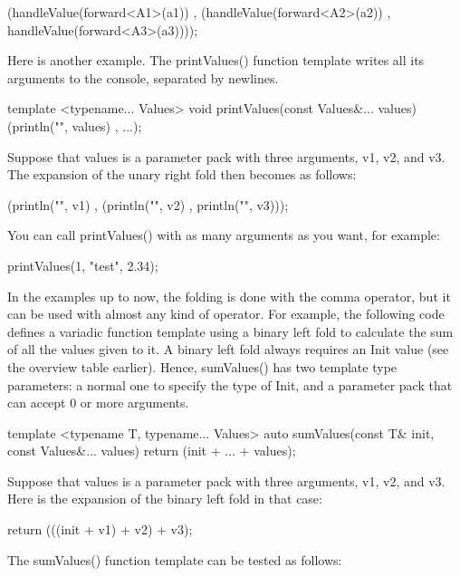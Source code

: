 \begin{cpp}
(handleValue(forward<A1>(a1)) ,
    (handleValue(forward<A2>(a2)) , handleValue(forward<A3>(a3))));
\end{cpp}

Here is another example. The printValues() function template writes all its arguments to the console, separated by newlines.

\begin{cpp}
template <typename... Values>
void printValues(const Values&... values) { (println("{}", values) , ...); }
\end{cpp}

Suppose that values is a parameter pack with three arguments, v1, v2, and v3. The expansion of the unary right fold then becomes as follows:

\begin{cpp}
(println("{}", v1) , (println("{}", v2) , println("{}", v3)));
\end{cpp}

You can call printValues() with as many arguments as you want, for example:

\begin{cpp}
printValues(1, "test", 2.34);
\end{cpp}

In the examples up to now, the folding is done with the comma operator, but it can be used with almost any kind of operator. For example, the following code defines a variadic function template using a binary left fold to calculate the sum of all the values given to it. A binary left fold always requires an Init value (see the overview table earlier). Hence, sumValues() has two template type parameters: a normal one to specify the type of Init, and a parameter pack that can accept 0 or more arguments.

\begin{cpp}
template <typename T, typename... Values>
auto sumValues(const T& init, const Values&... values)
{ return (init + ... + values);}
\end{cpp}

Suppose that values is a parameter pack with three arguments, v1, v2, and v3. Here is the expansion of the binary left fold in that case:

\begin{cpp}
return (((init + v1) + v2) + v3);
\end{cpp}

The sumValues() function template can be tested as follows:

